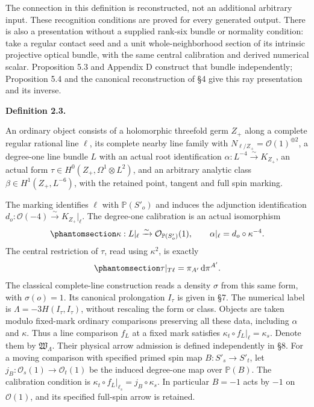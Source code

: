 \documentclass[
  english,
  11pt,
  reqno]{amsart}
\makeatletter
\newcommand{\pandocstatementheading}[1]{%
  \par\addpenalty{\@beginparpenalty}%
  \addvspace{.5\baselineskip plus .2\baselineskip minus .2\baselineskip}%
  {\normalfont\bfseries #1\par}%
  \nobreak\@afterindenttrue\@afterheading
}
\makeatother
\begin{document}
The connection in this definition is reconstructed, not an additional
arbitrary input. These recognition conditions are proved for every
generated output. There is also a presentation without a supplied
rank-six bundle or normality condition: take a regular contact seed and
a unit whole-neighborhood section of its intrinsic projective optical
bundle, with the same central calibration and derived numerical scalar.
Proposition 5.3 and Appendix D construct that bundle independently;
Proposition 5.4 and the canonical reconstruction of §4 give this ray
presentation and its inverse.

\pandocstatementheading{\protect{}\label{def:gg-ordinary-object}Definition 2.3.}

An ordinary object consists of a holomorphic threefold germ \(Z_+\)
along a complete regular rational line \(\ell\), its complete nearby
line family with \(N_{\ell/Z_+}=\mathcal O(1)^{\oplus2}\), a degree-one
line bundle \(L\) with an actual root identification
\(\alpha:L^{-4}\xrightarrow{\sim}K_{Z_+}\), an actual form
\(\tau\in H^0(Z_+,\Omega^1\otimes L^2)\), and an arbitrary analytic
class \(\beta\in H^1(Z_+,L^{-6})\), with the retained point, tangent and
full spin marking.

The marking identifies \(\ell\) with \(\mathbb P(S'_o)\) and induces the
adjunction identification
\(d_o:\mathcal O(-4)\xrightarrow{\sim}K_{Z_+}|_\ell\). The degree-one
calibration is an actual isomorphism
\begin{equation}\protect\phantomsection\label{eq:gg-ordinary-degree-one-calibration}{
 \kappa:L|_\ell\xrightarrow{\sim}\mathcal O_{\mathbb P(S'_o)}(1),
 \qquad \alpha|_\ell=d_o\circ\kappa^{-4}.
}\end{equation} The central restriction of \(\tau\), read using
\(\kappa^2\), is exactly
\begin{equation}\protect\phantomsection\label{eq:gg-central-ordinary-calibration}{
 \tau|_{T\ell}=\pi_{A'}\,\mathrm d\pi^{A'}.
}\end{equation} The classical complete-line construction reads a density
\(\sigma\) from this same form, with \(\sigma(o)=1\). Its canonical
prolongation \(I_\tau\) is given in §7. The numerical label is
\(\Lambda=-3H(I_\tau,I_\tau)\), without rescaling the form or class.
Objects are taken modulo fixed-mark ordinary comparisons preserving all
these data, including \(\alpha\) and \(\kappa\). Thus a line comparison
\(f_L\) at a fixed mark satisfies \(\kappa_t\circ f_L|_\ell=\kappa_s\).
Denote them by \(\mathfrak W_\Lambda\). Their physical arrow admission
is defined independently in §8. For a moving comparison with specified
primed spin map \(B:S'_s\to S'_t\), let
\(j_B:\mathcal O_s(1)\to\mathcal O_t(1)\) be the induced degree-one map
over \(\mathbb P(B)\). The calibration condition is
\(\kappa_t\circ f_L|_{\ell_s}=j_B\circ\kappa_s\). In particular \(B=-1\)
acts by \(-1\) on \(\mathcal O(1)\), and its specified full-spin arrow
is retained.
\end{document}
